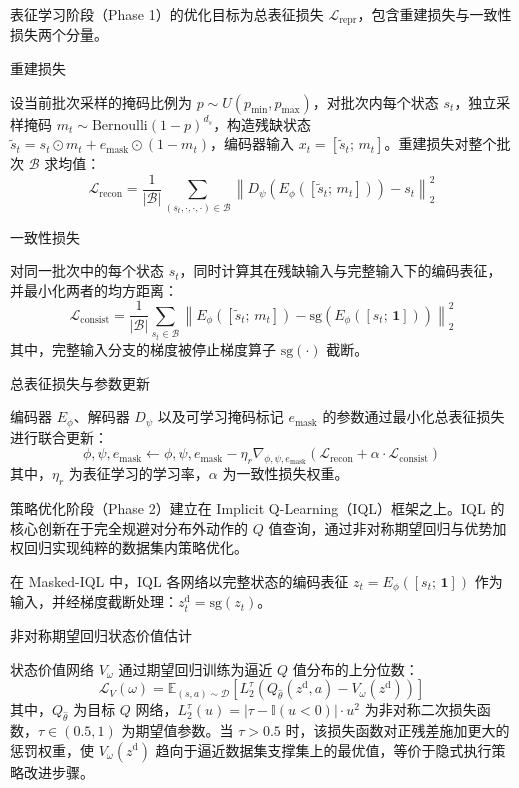 表征学习阶段（Phase 1）的优化目标为总表征损失 $\mathcal{L}_{\text{repr}}$，包含重建损失与一致性损失两个分量。

重建损失

设当前批次采样的掩码比例为 $p \sim U(p_{\min}, p_{\max})$，对批次内每个状态 $s_t$，独立采样掩码 $m_t \sim \text{Bernoulli}(1-p)^{d_s}$，构造残缺状态 $\tilde{s}_t = s_t \odot m_t + e_{\text{mask}} \odot (1 - m_t)$，编码器输入 $x_t = [\tilde{s}_t;\, m_t]$。重建损失对整个批次 $\mathcal{B}$ 求均值：
\begin{equation}
    \mathcal{L}_{\text{recon}} = \frac{1}{|\mathcal{B}|}\sum_{(s_t, \cdot, \cdot, \cdot) \in \mathcal{B}} \left\| D_\psi(E_\phi([\tilde{s}_t;\, m_t])) - s_t \right\|_2^2
\end{equation}

一致性损失

对同一批次中的每个状态 $s_t$，同时计算其在残缺输入与完整输入下的编码表征，并最小化两者的均方距离：
\begin{equation}
    \mathcal{L}_{\text{consist}} = \frac{1}{|\mathcal{B}|}\sum_{s_t \in \mathcal{B}} \left\| E_\phi([\tilde{s}_t;\, m_t]) - \text{sg}\!\left(E_\phi([s_t;\, \mathbf{1}])\right) \right\|_2^2
\end{equation}
其中，完整输入分支的梯度被停止梯度算子 $\text{sg}(\cdot)$ 截断。

总表征损失与参数更新

编码器 $E_\phi$、解码器 $D_\psi$ 以及可学习掩码标记 $e_{\text{mask}}$ 的参数通过最小化总表征损失进行联合更新：
\begin{equation}
    \phi, \psi, e_{\text{mask}} \leftarrow \phi, \psi, e_{\text{mask}} - \eta_r \nabla_{\phi, \psi, e_{\text{mask}}} \left(\mathcal{L}_{\text{recon}} + \alpha \cdot \mathcal{L}_{\text{consist}}\right)
\end{equation}
其中，$\eta_r$ 为表征学习的学习率，$\alpha$ 为一致性损失权重。


策略优化阶段（Phase 2）建立在 Implicit Q-Learning（IQL）\cite{kostrikov2022offline}框架之上。IQL 的核心创新在于完全规避对分布外动作的 $Q$ 值查询，通过非对称期望回归与优势加权回归实现纯粹的数据集内策略优化。

在 Masked-IQL 中，IQL 各网络以完整状态的编码表征 $z_t = E_\phi([s_t;\, \mathbf{1}])$ 作为输入，并经梯度截断处理：$z_t^{\text{d}} = \text{sg}(z_t)$。

非对称期望回归状态价值估计

状态价值网络 $V_\omega$ 通过期望回归训练为逼近 $Q$ 值分布的上分位数：
\begin{equation}
    \mathcal{L}_V(\omega) = \mathbb{E}_{(s, a) \sim \mathcal{D}}\!\left[L_2^\tau\!\left(Q_{\hat{\theta}}(z^{\text{d}}, a) - V_\omega(z^{\text{d}})\right)\right]
    \label{eq:iql_value}
\end{equation}
其中，$Q_{\hat{\theta}}$ 为目标 $Q$ 网络，$L_2^\tau(u) = |\tau - \mathbb{I}(u < 0)| \cdot u^2$ 为非对称二次损失函数，$\tau \in (0.5, 1)$ 为期望值参数。当 $\tau > 0.5$ 时，该损失函数对正残差施加更大的惩罚权重，使 $V_\omega(z^{\text{d}})$ 趋向于逼近数据集支撑集上的最优值，等价于隐式执行策略改进步骤。

